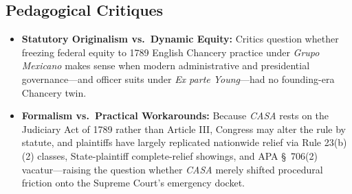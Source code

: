 \documentclass[12pt]{article}
\begin{document}
\subsection{Pedagogical Critiques}
\begin{itemize}
  \item \textbf{Statutory Originalism vs.\ Dynamic Equity:} Critics question whether freezing federal equity to 1789 English Chancery practice under \textit{Grupo Mexicano} makes sense when modern administrative and presidential governance---and officer suits under \textit{Ex parte Young}---had no founding-era Chancery twin.
  \item \textbf{Formalism vs.\ Practical Workarounds:} Because \textit{CASA} rests on the Judiciary Act of 1789 rather than Article III, Congress may alter the rule by statute, and plaintiffs have largely replicated nationwide relief via Rule 23(b)(2) classes, State-plaintiff complete-relief showings, and APA \S\ 706(2) vacatur---raising the question whether \textit{CASA} merely shifted procedural friction onto the Supreme Court's emergency docket.
\end{itemize}
\end{document}
